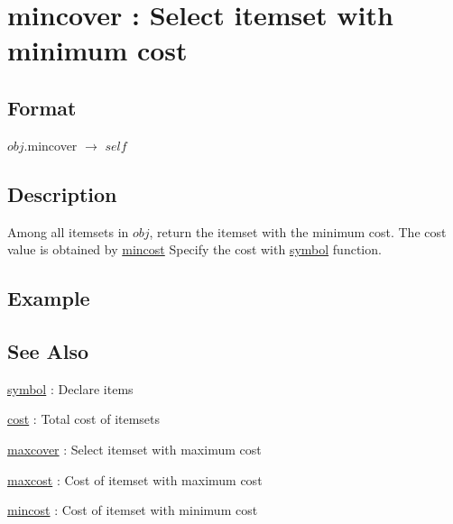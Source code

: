 
\section{mincover : Select itemset with minimum cost\label{sect:mincover}}
\subsection*{Format}
$obj$.mincover $\rightarrow$ $self$

\subsection*{Description}
Among all itemsets in $obj$, return the itemset with the minimum cost. The cost value is obtained by \hyperref[sect:mincost]{mincost}  
Specify the cost with \hyperref[sect:symbol]{symbol} function. 

\subsection*{Example}


\subsection*{See Also}
\hyperref[sect:symbol]{symbol} : Declare items 

\hyperref[sect:cost]{cost} : Total cost of itemsets

\hyperref[sect:maxcover]{maxcover} : Select itemset with maximum cost

\hyperref[sect:maxcost]{maxcost} : Cost of itemset with maximum cost

\hyperref[sect:mincost]{mincost} : Cost of itemset with minimum cost 


